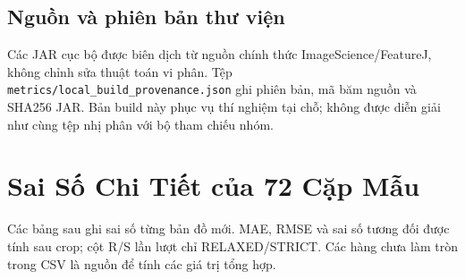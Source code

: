 \subsection{Nguồn và phiên bản thư viện}
Các JAR cục bộ được biên dịch từ nguồn chính thức ImageScience/FeatureJ, không
chỉnh sửa thuật toán vi phân. Tệp \texttt{metrics/local\_build\_provenance.json}
ghi phiên bản, mã băm nguồn và SHA256 JAR. Bản build này phục vụ thí nghiệm tại chỗ;
không được diễn giải như cùng tệp nhị phân với bộ tham chiếu nhóm.

\section{Sai Số Chi Tiết của 72 Cặp Mẫu}
Các bảng sau ghi sai số từng bản đồ mới. MAE, RMSE và sai số tương đối được
tính sau crop; cột R/S lần lượt chỉ RELAXED/STRICT. Các hàng chưa làm tròn trong
CSV là nguồn để tính các giá trị tổng hợp.
